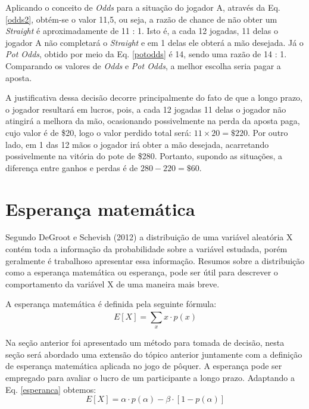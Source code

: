 \documentclass[
	12pt,				%
	oneside,			%
	a4paper,			%
	chapter=TITLE,		%
	section=TITLE,		%
	subsection=Title,	%
	subsubsection=Title,%
	brazil,				%
	]{abntex2}
\begin{document}
Aplicando o conceito de \textit{Odds} para a situação do jogador A, através da Eq. \ref{odds2}, obtém-se o valor 11,5, ou seja, a razão de chance de não obter um \textit{Straight} é aproximadamente de 11 : 1. Isto é, a cada 12 jogadas, 11 delas o jogador A não completará o \textit{Straight} e em 1 delas ele obterá a mão desejada. Já o \textit{Pot Odds}, obtido por meio da Eq. \ref{potodds} é 14, sendo uma razão de 14 : 1. Comparando os valores de \textit{Odds} e \textit{Pot Odds}, a melhor escolha seria pagar a aposta.

A justificativa dessa decisão decorre principalmente do fato de que a longo prazo, o jogador resultará em lucros, pois, a cada 12 jogadas 11 delas o jogador não atingirá a melhora da mão, ocasionando possivelmente na perda da aposta paga, cujo valor é de \$20, logo o valor perdido total será: $11 \times 20 =  \$220$. Por outro lado, em 1 das 12 mãos o jogador irá obter a mão desejada, acarretando possivelmente na vitória do pote de \$280. Portanto, supondo as situações, a diferença entre ganhos e perdas é de $280 - 220 = \$60$.

\newpage
\section{Esperança matemática}
Segundo DeGroot e Schevish (2012) a distribuição de uma variável aleatória X contém toda a informação da probabilidade sobre a variável estudada, porém geralmente é trabalhoso apresentar essa informação. Resumos sobre a distribuição como a esperança matemática ou esperança, pode ser útil para descrever o comportamento da variável X de uma maneira mais breve.

A esperança matemática é definida pela seguinte fórmula:
\begin{equation} \label{esperanca}
E[X] = \sum_{x}^{} x \cdot p(x)
\end{equation}

Na seção anterior foi apresentado um método para tomada de decisão, nesta seção será abordado uma extensão do tópico anterior juntamente com a definição de esperança matemática aplicada no jogo de pôquer. A esperança pode ser empregado para avaliar o lucro de um participante a longo prazo. Adaptando a Eq. \ref{esperanca} obtemos:
\begin{equation} \label{esperancapoquer}
E[X] = \alpha \cdot p(\alpha) - \beta \cdot [1 - p(\alpha)]
\end{equation}
\end{document}
